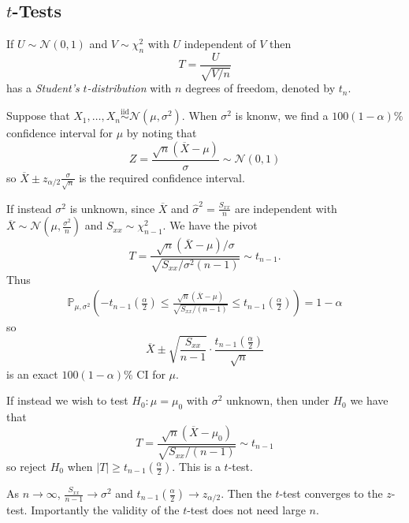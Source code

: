 \documentclass{article}
\newcommand{\iid}{\overset{\text{iid}}{\sim}}
\begin{document}
\subsection{$t$-Tests}
\begin{definition}
  If $ U\sim\mathcal N(0,1) $ and $ V\sim\chi_n^2 $ with $ U $ independent of $ V $ then
  \[
	  T= \frac U{\sqrt{V/n}}
  \]
  has a \textit{Student's} $ t $\textit{-distribution} with $ n $ degrees of freedom, denoted by $ t_n $.
\end{definition}
\begin{example}
  Suppose that $ X_1,\dots, X_n\iid \mathcal N(\mu,\sigma^2) $. When $ \sigma^2 $ is knonw, we find a $ 100(1-\alpha)\% $ confidence interval for $ \mu $ by noting that 
  \[
	  Z = \frac{\sqrt n (\overline X - \mu)}\sigma\sim\mathcal N(0,1)
  \]
  so $ \overline X \pm z_{\alpha/2}\frac\sigma{\sqrt n} $ is the required confidence interval. 
\end{example}
\begin{example}
	If instead $ \sigma^2 $ is unknown, since $ \overline X $ and $ \hat \sigma^2 = \frac{S_{xx}}n $ are independent with $ \overline X \sim\mathcal N(\mu,\frac{\sigma^2}n) $ and $ S_{xx}\sim \chi_{n-1}^2 $. We have the pivot
	\[
		T = \frac{\sqrt n (\overline X -\mu)/\sigma}{\sqrt{S_{xx}/\sigma^2(n-1)}}\sim t_{n-1}.
	\]
	Thus
	\begin{align*}
		\mathbb P_{\mu,\sigma^2}\left(-t_{n-1}\left(\frac \alpha 2\right) \le \frac{\sqrt n(\overline X -\mu)}{\sqrt{S_{xx}/(n-1)}} \le t_{n-1}\left(\frac \alpha2\right)\right) = 1-\alpha
	\end{align*}
	so
	\[
		\overline X\pm \sqrt{\frac{S_{xx}}{n-1}}\cdot \frac{t_{n-1}\left(\frac \alpha 2\right)}{\sqrt n}
	\]
	is an exact $ 100(1-\alpha)\% $ CI for $ \mu $.
\end{example}
\begin{example}
  If instead we wish to test $ H_0:\mu = \mu_0 $ with $ \sigma^2 $ unknown, then under $ H_0 $ we have that
  \[
	  T = \frac{\sqrt n(\overline X - \mu_0)}{\sqrt{S_{xx}/(n-1)}}\sim t_{n-1}
  \]
  so reject $ H_0 $ when $ |T|\ge t_{n-1}\left(\frac \alpha 2\right) $. This is a $ t $-test.
\end{example}
\begin{remark}
	As $ n\to\infty $, $ \frac{S_{xx}}{n-1}\to \sigma^2 $ and $ t_{n-1}\left(\frac \alpha 2\right) \to z_{\alpha /2} $. Then the $ t $-test converges to the $ z $-test. Importantly the validity of the $ t $-test does not need large $ n $.
\end{remark}
\end{document}

